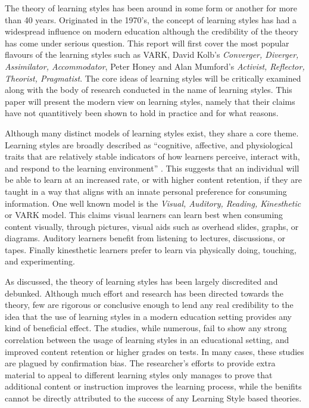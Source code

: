 \documentclass[12pt]{report}
\begin{document}


The theory of learning styles has been around in some form or another for
more than 40 years. Originated in the 1970's, the concept of learning
styles has had a widespread influence on modern education although the
credibility of the theory has come under serious question. This report will
first cover the most popular flavours of the learning styles such as VARK,
David Kolb's \textit{Converger, Diverger, Assimilator, Accommodator}, Peter
Honey and Alan Mumford's \textit{Activist, Reflector, Theorist, Pragmatist}.
The core ideas of learning styles will be critically examined along with the
body of research conducted in the name of learning styles.  This paper will
present the modern view on learning styles, namely that their claims have
not quantitively been shown to hold in practice and for what reasons.

Although many distinct models of learning styles exist, they share a core
theme. Learning styles are broadly described as ``cognitive, affective, and
physiological traits that are relatively stable indicators of how learners
perceive, interact with, and respond to the learning environment''
\cite{keefe1990developing}. This suggests that an individual will be able to
learn at an increased rate, or with higher content retention, if they are
taught in a way that aligns with an innate personal preference for consuming
information.  One well known model is the \textit{Visual, Auditory, Reading,
Kinesthetic} or VARK model. This claims visual learners can learn best when
consuming content visually, through pictures, visual aids such as overhead
slides, graphs, or diagrams. Auditory learners benefit from listening to
lectures, discussions, or tapes. Finally kinesthetic learners prefer to
learn via physically doing, touching, and experimenting.

As discussed, the theory of learning styles has been largely discredited and
debunked. Although much effort and research has been directed towards the
theory, few are rigorous or conclusive enough to lend any real credibility
to the idea that the use of learning styles in a modern education setting
provides any kind of beneficial effect. The studies, while numerous, fail to
show any strong correlation between the usage of learning styles in an
educational setting, and improved content retention or higher grades on
tests. In many cases, these studies are plagued by confirmation bias. The
researcher's efforts to provide extra material to appeal to different
learning styles only manages to prove that additional content or instruction
improves the learning process, while the benifits cannot be directly
attributed to the success of any Learning Style based theories.
\end{document}
